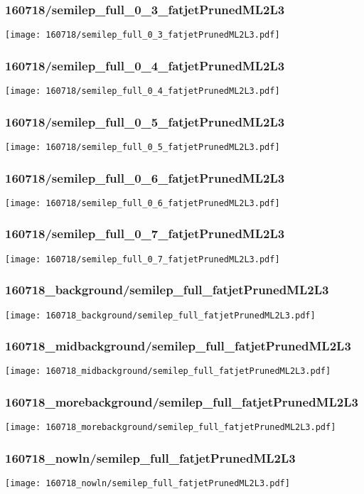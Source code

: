 \begin{frame}
   \frametitle{\small 160718/semilep\_full\_0\_3\_fatjetPrunedML2L3}
   \centering
   \texttt{[image: 160718/semilep\_full\_0\_3\_fatjetPrunedML2L3.pdf]}
\end{frame}

\begin{frame}
   \frametitle{\small 160718/semilep\_full\_0\_4\_fatjetPrunedML2L3}
   \centering
   \texttt{[image: 160718/semilep\_full\_0\_4\_fatjetPrunedML2L3.pdf]}
\end{frame}

\begin{frame}
   \frametitle{\small 160718/semilep\_full\_0\_5\_fatjetPrunedML2L3}
   \centering
   \texttt{[image: 160718/semilep\_full\_0\_5\_fatjetPrunedML2L3.pdf]}
\end{frame}

\begin{frame}
   \frametitle{\small 160718/semilep\_full\_0\_6\_fatjetPrunedML2L3}
   \centering
   \texttt{[image: 160718/semilep\_full\_0\_6\_fatjetPrunedML2L3.pdf]}
\end{frame}

\begin{frame}
   \frametitle{\small 160718/semilep\_full\_0\_7\_fatjetPrunedML2L3}
   \centering
   \texttt{[image: 160718/semilep\_full\_0\_7\_fatjetPrunedML2L3.pdf]}
\end{frame}

\begin{frame}
   \frametitle{\small 160718\_background/semilep\_full\_fatjetPrunedML2L3}
   \centering
   \texttt{[image: 160718\_background/semilep\_full\_fatjetPrunedML2L3.pdf]}
\end{frame}

\begin{frame}
   \frametitle{\small 160718\_midbackground/semilep\_full\_fatjetPrunedML2L3}
   \centering
   \texttt{[image: 160718\_midbackground/semilep\_full\_fatjetPrunedML2L3.pdf]}
\end{frame}

\begin{frame}
   \frametitle{\small 160718\_morebackground/semilep\_full\_fatjetPrunedML2L3}
   \centering
   \texttt{[image: 160718\_morebackground/semilep\_full\_fatjetPrunedML2L3.pdf]}
\end{frame}

\begin{frame}
   \frametitle{\small 160718\_nowln/semilep\_full\_fatjetPrunedML2L3}
   \centering
   \texttt{[image: 160718\_nowln/semilep\_full\_fatjetPrunedML2L3.pdf]}
\end{frame}

